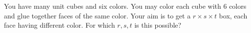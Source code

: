 You have many unit cubes and six colors. You may color each cube with $6$ colors and glue together faces of the same color. Your aim is to get a $r \times s \times t$ box, each face having different color. For which $r, s, t$ is this possible?
